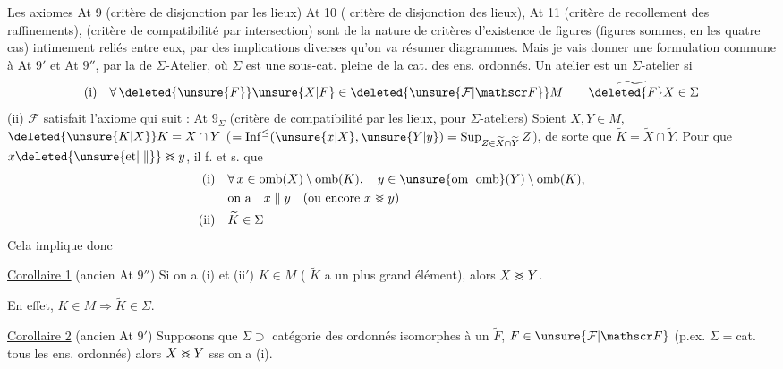  Les axiomes At 9 (critère de disjonction par les lieux)  At 10  ( critère de disjonction des lieux), At 11 (critère de recollement des raffinements),   (critère de compatibilité par intersection) sont de la nature de critères d'existence de figures (figures sommes,  en les quatre cas) intimement reliés entre eux, par des implications diverses\unsure{,|;} qu'on va résumer  diagrammes. Mais je vais  donner une formulation commune   à At $9'$ et At $9''$, par la  de $\Sigma$-Atelier, où $\Sigma$ est une sous-cat. pleine de la cat. des ens. ordonnés. Un atelier est un $\Sigma$-atelier si
\[
\text{(i)}\quad \forall\,\deleted{\unsure{F}}\unsure{X|F}\in\deleted{\unsure{\mathcal F|\mathscr F}}M\qquad \widetilde{\deleted{F}X}\in\Sigma
\]
(ii) $\mathcal F$ satisfait l'axiome qui suit :
At $9_{\Sigma}$ (critère de compatibilité par les lieux, pour $\Sigma$-ateliers) Soient $X,Y\in M$,  $\deleted{\unsure{K|X}}K=X\cap Y$ ($=\operatorname{Inf}^{\leq}(\unsure{x|X},\unsure{Y|y})=\operatorname{Sup}_{Z\in\widetilde X\cap\widetilde Y} Z$), de sorte que $\widetilde K=\widetilde X\cap\widetilde Y$. Pour que $x\deleted{\unsure{\text{et}|\parallel}}\mathrel{>\mkern-14mu<}y$,   il \deleted{\unsure{(}}f. et \deleted{\unsure{)}}s. que
\[
\begin{aligned}
\text{(i)}\quad &\forall\,x\in\operatorname{omb}(X)\setminus\operatorname{omb}(K),\quad y\in\unsure{\operatorname{om}|\operatorname{omb}}(Y)\setminus\operatorname{omb}(K),\\
&\text{on a}\quad x\parallel y\quad\text{(ou encore }x\mathrel{>\mkern-14mu<}y\text{)}\\
\text{(ii)}\quad &\widetilde K\in\Sigma
\end{aligned}
\]
Cela implique donc

\uline{Corollaire 1} (ancien At $9''$) Si on a (i) et (ii$'$) $K\in M$ ( $\widetilde K$ a un plus grand élément), alors $X\mathrel{>\mkern-14mu<}Y$.

En effet,  $K\in M\Longrightarrow\widetilde K\in\Sigma$.

\uline{Corollaire 2} (ancien At $9'$) Supposons que $\Sigma\supset$ catégorie des  ordonnés isomorphes à un $\widetilde F$, $F\in\unsure{\mathcal F|\mathscr F}$ (p.ex. $\Sigma={}$cat.  tous les ens. ordonnés) alors $X\mathrel{>\mkern-14mu<}Y$ sss on a (i).

